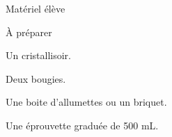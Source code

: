 
\begin{boiteMateriel}{Matériel élève}
\end{boiteMateriel}

\begin{boiteMateriel}{À préparer}
  \begin{listePoints}
    \item Un cristallisoir.
    \item Deux bougies.
    \item Une boite d’allumettes ou un briquet.
    \item Une éprouvette graduée de 500 mL.
  \end{listePoints}
\end{boiteMateriel}